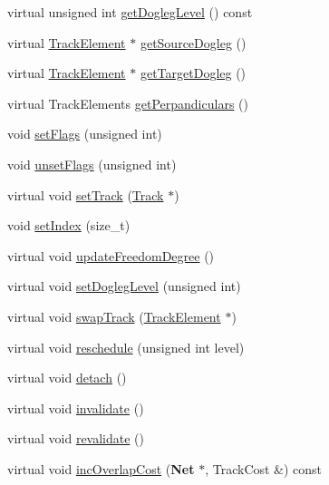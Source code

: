 \begin{DoxyCompactItemize}
virtual unsigned int \hyperlink{classKite_1_1TrackElement_ace669b962e7df815b92fe70e1f4ad755}{get\-Dogleg\-Level} () const 
\item 
virtual \hyperlink{classKite_1_1TrackElement}{Track\-Element} $\ast$ \hyperlink{classKite_1_1TrackElement_a7e79fbfe77f173d46b1959c41087930a}{get\-Source\-Dogleg} ()
\item 
virtual \hyperlink{classKite_1_1TrackElement}{Track\-Element} $\ast$ \hyperlink{classKite_1_1TrackElement_aeb4e39bd925d093e6c45599433bb421c}{get\-Target\-Dogleg} ()
\item 
virtual Track\-Elements \hyperlink{classKite_1_1TrackElement_aa0ba92ebf19f596537dc051c090d5736}{get\-Perpandiculars} ()
\item 
void \hyperlink{classKite_1_1TrackElement_aeb14f94914af58657a0dc2f50ec98df5}{set\-Flags} (unsigned int)
\item 
void \hyperlink{classKite_1_1TrackElement_a1a6fac115cb81db48e3ac9ffa0721bb5}{unset\-Flags} (unsigned int)
\item 
virtual void \hyperlink{classKite_1_1TrackElement_abd3d8093f871d3d1a7f24b053648026c}{set\-Track} (\hyperlink{classKite_1_1Track}{Track} $\ast$)
\item 
void \hyperlink{classKite_1_1TrackElement_abee236b4d62f51320212f31e010fc1b5}{set\-Index} (size\-\_\-t)
\item 
virtual void \hyperlink{classKite_1_1TrackElement_af5332d647c0482aa90ad7cc9b2a50f3a}{update\-Freedom\-Degree} ()
\item 
virtual void \hyperlink{classKite_1_1TrackElement_a2b90319cb042b283aa5d1fdb1992f11f}{set\-Dogleg\-Level} (unsigned int)
\item 
virtual void \hyperlink{classKite_1_1TrackElement_acc245ce084989d1c34816d0e61b9d510}{swap\-Track} (\hyperlink{classKite_1_1TrackElement}{Track\-Element} $\ast$)
\item 
virtual void \hyperlink{classKite_1_1TrackElement_a0ffe603ec7d46f21f5e56ccbe84c03fb}{reschedule} (unsigned int level)
\item 
virtual void \hyperlink{classKite_1_1TrackElement_ac295bade8aee589f6718dfa79edc2a34}{detach} ()
\item 
virtual void \hyperlink{classKite_1_1TrackElement_a893f1101c650c08c98612515c2b1a89c}{invalidate} ()
\item 
virtual void \hyperlink{classKite_1_1TrackElement_a5bd93abe1416952ace15a98dbeeed124}{revalidate} ()
\item 
virtual void \hyperlink{classKite_1_1TrackElement_a250348f9030b92b19580749bf99030b5}{inc\-Overlap\-Cost} ({\bf Net} $\ast$, Track\-Cost \&) const 

\end{DoxyCompactItemize}
